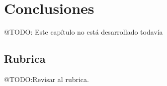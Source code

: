 \chapter{Conclusiones}\label{ch:chapter_6}

\colorbox{color_highlight}{@TODO: Este capítulo no está desarrollado todavía}


\section{Rubrica}
\colorbox{color_highlight}{@TODO:Revisar al rubrica.}

